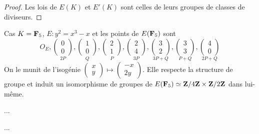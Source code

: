 	\begin{proof}
		Les lois de $E(K)$ et $E'(K)$ sont celles de leurs groupes de classes de diviseurs.
	\end{proof}
	
	\begin{ex}
		Cas $K = \mathbf{F}_5$, $E : y^2 = x^3 - x$ et les points de $E(\mathbf{F}_5)$ sont
		$$O_E, \underset{2P}{\begin{pmatrix} 0 \\ 0 \end{pmatrix}},
		\underset{Q}{\begin{pmatrix} 1 \\ 0 \end{pmatrix}},
		\underset{P}{\begin{pmatrix} 2 \\ 1 \end{pmatrix}},
		\underset{3P}{\begin{pmatrix} 2 \\ 4 \end{pmatrix}},
		\underset{3P + Q}{\begin{pmatrix} 3 \\ 2 \end{pmatrix}},
		\underset{P + Q}{\begin{pmatrix} 3 \\ 3 \end{pmatrix}},
		\underset{2P + Q}{\begin{pmatrix} 4 \\ 0 \end{pmatrix}}$$
		On le munit de l'isogénie $\begin{pmatrix} x \\ y \end{pmatrix} \mapsto \begin{pmatrix} -x \\ 2y \end{pmatrix}$.
		Elle respecte la structure de groupe et induit un isomorphisme de groupes de $E(\mathbf{F}_5) \simeq \mathbf{Z} / 4\mathbf{Z} \times \mathbf{Z} / 2\mathbf{Z}$ dans lui-même.
	\end{ex}
	
	...%
	
	\begin{rem}
		...%
	\end{rem}
	
